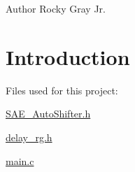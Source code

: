 \begin{DoxyAuthor}{Author}
Rocky Gray Jr.
\end{DoxyAuthor}
\hypertarget{index_intro}{}\section{Introduction}\label{index_intro}
Files used for this project\-:
\begin{DoxyItemize}
\item \hyperlink{_s_a_e___auto_shifter_8h}{S\-A\-E\-\_\-\-Auto\-Shifter.\-h}
\item \hyperlink{delay__rg_8h}{delay\-\_\-rg.\-h}
\item \hyperlink{main_8c}{main.\-c} 
\end{DoxyItemize}